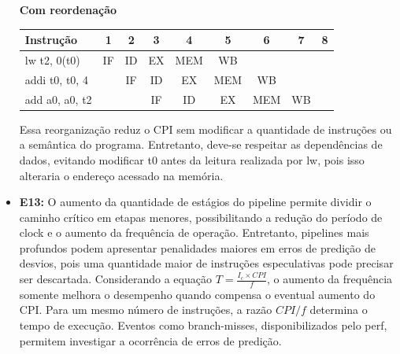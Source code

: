 \documentclass[12pt,a4paper,titlepage]{article}
\begin{document}
\begin{itemize}
        \begin{center}
            \textbf{Com reordenação}

            \smallskip
            \begin{tabular}{|l|*{8}{c|}}
                \hline
                Instrução & 1 & 2 & 3 & 4 & 5 & 6 & 7 & 8 \\
                \hline
                lw t2, 0(t0)    & IF & ID & EX & MEM & WB  &     &    & \\
                addi t0, t0, 4  &    & IF & ID & EX  & MEM & WB  &    & \\
                add a0, a0, t2  &    &    & IF & ID  & EX  & MEM & WB & \\
                \hline
            \end{tabular}
        \end{center}

        Essa reorganização reduz o CPI sem modificar a quantidade de instruções ou a semântica do programa.
        Entretanto, deve-se respeitar as dependências de dados, evitando modificar t0 antes da leitura realizada por lw,
        pois isso alteraria o endereço acessado na memória.

    \item\textbf{E13:}
        O aumento da quantidade de estágios do pipeline permite dividir o caminho crítico em etapas menores, possibilitando
        a redução do período de clock e o aumento da frequência de operação.
        Entretanto, pipelines mais profundos podem apresentar penalidades maiores em erros de predição de desvios, pois uma
        quantidade maior de instruções especulativas pode precisar ser descartada.
        Considerando a equação $T = \frac{I_c \times CPI}{f}$, o aumento da frequência somente melhora o desempenho quando
        compensa o eventual aumento do CPI. Para um mesmo número de instruções, a razão $CPI/f$ determina o tempo de execução.
        Eventos como branch-misses, disponibilizados pelo perf, permitem investigar a ocorrência de erros de predição.
\end{itemize}
\end{document}
